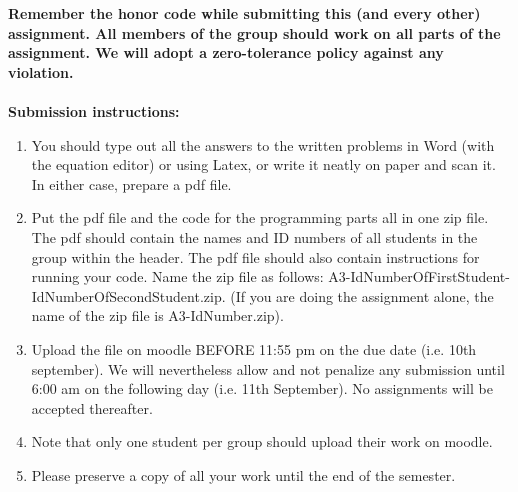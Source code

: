 \documentclass[11pt]{article}
\begin{document}
\maketitle

\textbf{Remember the honor code while submitting this (and every other) assignment. All members of the group should work on all parts of the assignment. We will adopt a \textbf{zero-tolerance policy} against any violation.}
\\
\\
\textbf{Submission instructions:} 
\begin{enumerate}
\item You should type out all the answers to the written problems in Word (with the equation editor) or using Latex, or write it neatly on paper and scan it. In either case, prepare a pdf file. 
\item Put the pdf file and the code for the programming parts all in one zip file. The pdf should contain the names and ID numbers of all students in the group within the header. The pdf file should also contain instructions for running your code. Name the zip file as follows: A3-IdNumberOfFirstStudent-IdNumberOfSecondStudent.zip. (If you are doing the assignment alone, the name of the zip file is A3-IdNumber.zip). 
\item Upload the file on moodle BEFORE 11:55 pm on the due date (i.e. 10th september). We will nevertheless allow and not penalize any submission until 6:00 am on the following day (i.e. 11th September). No assignments will be accepted thereafter. 
\item Note that only one student per group should upload their work on moodle. 
\item Please preserve a copy of all your work until the end of the semester. 
\end{enumerate}
\end{document}
